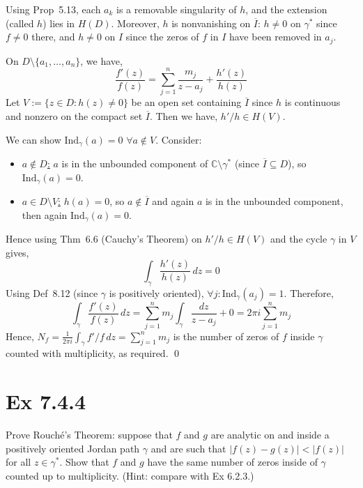 \documentclass[a4paper]{article}
\begin{document}
Using Prop~5.13, each $a_k$ is a
removable singularity of $h$, and the extension (called $h$) lies in $H(D)$. Moreover,
$h$ is nonvanishing on $\overline{I}$: $h \neq 0$ on $\gamma^*$ since $f \neq 0$ there, and
$h \neq 0$ on $I$ since the zeros of $f$ in $I$ have been removed in $a_j$.

\medskip
On $D \setminus \{a_1, \ldots, a_n\}$, we have,
\[
\frac{f'(z)}{f(z)} = \sum_{j=1}^n \frac{m_j}{z - a_j} + \frac{h'(z)}{h(z)}
\]
Let $V := \{z \in D : h(z) \neq 0\}$ be an open set containing $\overline{I}$ since $h$ is
continuous and nonzero on the compact set $\overline{I}$. Then we have, $h'/h \in H(V)$.

\medskip
We can show $\mathrm{Ind}_\gamma(a) = 0$ $\forall a \notin V$. Consider:

\begin{itemize}
    \item \underline{$a \notin D$:} $a$ is in
    the unbounded component of $\mathbb{C} \setminus \gamma^*$ (since $\overline{I} \subseteq D$),
    so $\mathrm{Ind}_\gamma(a) = 0$. 
    
    \item \underline{$a \in D \setminus V$:} $h(a) = 0$, so $a \notin
    \overline{I}$ and again $a$ is in the unbounded component, then again $\mathrm{Ind}_\gamma(a) = 0$.
\end{itemize}

Hence using Thm~6.6 (Cauchy's Theorem) on $h'/h \in H(V)$ and the cycle $\gamma$ in $V$ gives,
\[
\int_\gamma \frac{h'(z)}{h(z)}\,dz = 0
\]
Using Def~8.12 (since $\gamma$ is positively oriented), $\forall j: \mathrm{Ind}_\gamma(a_j) = 1$. Therefore,
\[
\int_\gamma \frac{f'(z)}{f(z)}\,dz
= \sum_{j=1}^n m_j \int_\gamma \frac{dz}{z - a_j} + 0
= 2\pi i \sum_{j=1}^n m_j
\]
Hence, $\displaystyle N_f = \frac{1}{2\pi i}\int_\gamma f'/f\,dz = \sum_{j=1}^n m_j$ is the number of zeros
of $f$ inside $\gamma$ counted with multiplicity, as required. \qed


\newpage
\section*{Ex 7.4.4}

\begin{tcolorbox}[colback=gray!10, colframe=black, boxrule=0.5pt, arc=2mm]
Prove Rouch\'e's Theorem: suppose that $f$ and $g$ are analytic on and inside a positively
oriented Jordan path $\gamma$ and are such that $|f(z) - g(z)| < |f(z)|$ for all
$z \in \gamma^*$. Show that $f$ and $g$ have the same number of zeros inside of $\gamma$
counted up to multiplicity. (Hint: compare with Ex 6.2.3.)
\end{tcolorbox}
\end{document}

